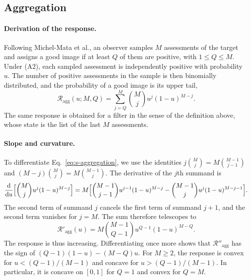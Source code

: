 \documentclass[10pt]{wlscirep}
\newcommand{\Rmap}{\mathscr{R}}            %
\newcommand{\dd}{\mathrm{d}}
\theoremstyle{plain}
\theoremstyle{remark}
\begin{document}
\subsection{Aggregation}

\paragraph{Derivation of the response.} Following Michel-Mata et al., an observer samples $M$ assessments of the target and assigns a good image if at least $Q$ of them are positive, with $1\leq Q\leq M$. Under (A2), each sampled assessment is independently positive with probability $u$. The number of positive assessments in the sample is then binomially distributed, and the probability of a good image is its upper tail,
\begin{equation}
\Rmap_{\mathrm{agg}}(u;M,Q)=\sum_{j=Q}^{M}\binom{M}{j}u^j(1-u)^{M-j}.
\label{eq:s-aggregation}
\end{equation}
The same response is obtained for a filter in the sense of the definition above, whose state is the list of the last $M$ assessments.

\paragraph{Slope and curvature.} To differentiate Eq.~\eqref{eq:s-aggregation}, we use the identities $j\binom{M}{j}=M\binom{M-1}{j-1}$ and $(M-j)\binom{M}{j}=M\binom{M-1}{j}$. The derivative of the $j$th summand is
\begin{equation}
\frac{\dd}{\dd u}\Bigl[\binom{M}{j}u^j(1-u)^{M-j}\Bigr]
=M\Bigl[\binom{M-1}{j-1}u^{j-1}(1-u)^{M-j}-\binom{M-1}{j}u^{j}(1-u)^{M-j-1}\Bigr].
\label{eq:s-agg-term}
\end{equation}
The second term of summand $j$ cancels the first term of summand $j+1$, and the second term vanishes for $j=M$. The sum therefore telescopes to
\begin{equation}
\Rmap'_{\mathrm{agg}}(u)=M\binom{M-1}{Q-1}u^{Q-1}(1-u)^{M-Q}.
\label{eq:s-agg-derivative}
\end{equation}
The response is thus increasing. Differentiating once more shows that $\Rmap''_{\mathrm{agg}}$ has the sign of $(Q-1)(1-u)-(M-Q)u$. For $M\geq2$, the response is convex for $u<(Q-1)/(M-1)$ and concave for $u>(Q-1)/(M-1)$. In particular, it is concave on $[0,1]$ for $Q=1$ and convex for $Q=M$.
\end{document}
